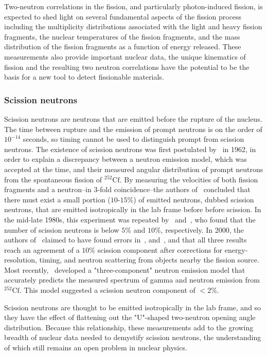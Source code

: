 Two-neutron correlations in the fission, and particularly photon-induced fission, is expected to shed light on several fundamental aspects of the fission process including the multiplicity distributions associated with the light and heavy fission fragments, the nuclear temperatures of the fission fragments, and the mass distribution of the fission fragments as a function of energy released.
These measurements also provide important nuclear data, the unique kinematics of fission and the resulting two neutron correlations have the potential to be the basis for a new tool to detect fissionable materials.

\subsubsection{Scission neutrons} 
Scission neutrons are neutrons that are emitted before the rupture of the nucleus.
The time between rupture and the emission of prompt neutrons is on the order of $10^{-14}$ seconds, so timing cannot be used to distinguish prompt from scission neutrons.
The existence of scission neutrons was first postulated by~\cite{Bowman} in 1962, in order to explain a discrepancy between a neutron emission model, which was accepted at the time, and their measured angular distribution of prompt neutrons from the spontaneous fission of $^{252}\text{Cf}$.
By measuring the velocities of both fission fragments and a neutron--in 3-fold coincidence--the authors of~\cite{Bowman} concluded that there must exist a small portion ($\text{10-15\%}$) of emitted neutrons, dubbed scission neutrons, that are emitted isotropically in the lab frame before before scission.
In the mid-late 1980s, this experiment was repeated by~\cite{seregina1985} and~\cite{JORGENSEN}, who found that the number of scission neutrons is below $5\%$ and $10\%$, respectively.
In 2000, the authors of~\cite{KORNILOV2001} claimed to have found errors in~\cite{Bowman,JORGENSEN}, and~\cite{seregina1985}, and that all three results reach an agreement of a $10\%$ scission component after corrections for energy-resolution, timing, and neutron scattering from objects nearby the fission source.
Most recently,~\cite{serot2017influence} developed a "three-component" neutron emission model that accurately predicts the measured spectrum of gamma and neutron emission from $^{252}\text{Cf}$.
This model suggested a scission neutron component of $<$2\%.

Scission neutrons are thought to be emitted isotropically in the lab frame, and so they have the effect of flattening out the "U"-shaped two-neutron opening angle distribution.
Because this relationship, these measurements add to the growing breadth of nuclear data needed to demystify scission neutrons, the understanding of which still remains an open problem in nuclear physics.

